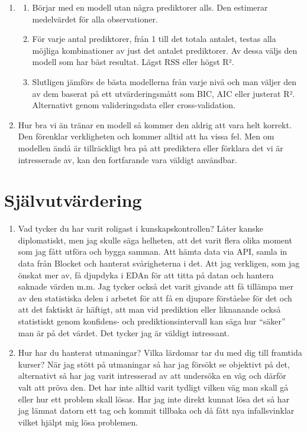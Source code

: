 \documentclass[
  letterpaper,
  DIV=11,
  numbers=noendperiod]{scrreprt}
\providecommand{\tightlist}{%
  \setlength{\itemsep}{0pt}\setlength{\parskip}{0pt}}\usepackage{longtable,booktabs,array}
\begin{document}
\begin{enumerate}
\def\labelenumi{\arabic{enumi}.}
\setcounter{enumi}{5}
\tightlist
\item
  \begin{enumerate}
  \def\labelenumii{\arabic{enumii}.}
  \tightlist
  \item
    Börjar med en modell utan några prediktorer alls. Den estimerar
    medelvärdet för alla observationer.
  \item
    För varje antal prediktorer, från 1 till det totala antalet, testas
    alla möjliga kombinationer av just det antalet prediktorer. Av dessa
    väljs den modell som har bäst resultat. Lägst RSS eller högst R².
  \item
    Slutligen jämförs de bästa modellerna från varje nivå och man väljer
    den av dem baserat på ett utvärderingsmått som BIC, AIC eller
    justerat R². Alternativt genom valideringsdata eller
    cross-validation.
  \end{enumerate}
\item
  Hur bra vi än tränar en modell så kommer den aldrig att vara helt
  korrekt. Den förenklar verkligheten och kommer alltid att ha vissa
  fel. Men om modellen ändå är tillräckligt bra på att prediktera eller
  förklara det vi är intresserade av, kan den fortfarande vara väldigt
  användbar.
\end{enumerate}


\chapter{Självutvärdering}\label{sjuxe4lvutvuxe4rdering}

\begin{enumerate}
\def\labelenumi{\arabic{enumi}.}
\item
  Vad tycker du har varit roligast i kunskapskontrollen? Låter kanske
  diplomatiskt, men jag skulle säga helheten, att det varit flera olika
  moment som jag fått utföra och bygga samman. Att hämta data via API,
  samla in data från Blocket och hanterat svårigheterna i det. Att jag
  verkligen, som jag önskat mer av, få djupdyka i EDAn för att titta på
  datan och hantera saknade värden m.m. Jag tycker också det varit
  givande att få tillämpa mer av den statistiska delen i arbetet för att
  få en djupare förståelse för det och att det faktiskt är häftigt, att
  man vid prediktion eller liknanande också statistiskt genom konfidens-
  och prediktionsintervall kan säga hur ``säker'' man är på det värdet.
  Det tycker jag är väldigt intressant.
\item
  Hur har du hanterat utmaningar? Vilka lärdomar tar du med dig till
  framtida kurser? När jag stött på utmaningar så har jag försökt se
  objektivt på det, alternativt så har jag varit intresserad av att
  undersöka en väg och därför valt att pröva den. Det har inte alltid
  varit tydligt vilken väg man skall gå eller hur ett problem skall
  lösas. Har jag inte direkt kunnat lösa det så har jag lämnat datorn
  ett tag och kommit tillbaka och då fått nya infallsvinklar vilket
  hjälpt mig lösa problemen.
\end{enumerate}
\end{document}

